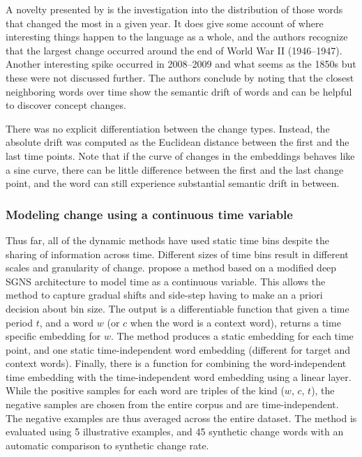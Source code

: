 \documentclass[output=paper]{langsci/langscibook}
\begin{document}
A novelty presented by \citet{rudolphb18-dynamicembforlangevo} is the investigation into the distribution of those words that changed the most in a given year. It does give some account of where interesting things happen to the language as a whole, and the authors recognize that the largest change occurred around the end of World War II (1946--1947). 
Another interesting spike occurred in 2008--2009 and what seems as the 1850s but these were not discussed further. 
The authors conclude by noting that the closest neighboring words over time show the semantic drift of words and can be helpful to discover concept changes. 

 There was no explicit differentiation between the change types. Instead, 
the absolute drift was computed as the Euclidean distance between the first and the last time points. Note that if the curve of changes in the embeddings behaves like a sine curve, there can be little difference between the first and the last change point, and the word can still experience substantial semantic drift in between.


\subsubsection{Modeling change using a continuous time variable}
Thus far, all of the dynamic methods have used static time bins despite the sharing of information across time. Different sizes of time bins result in different scales and granularity of change.  \citet{rosenfeld-erk-2018-deep} propose a method based on a modified deep SGNS architecture to model time as a continuous variable. This allows the method to capture gradual shifts and side-step having to make an a priori decision about bin size. The output is a differentiable function that given a time period $t$, and a word $w$ (or $c$ when the word is a context word), returns a time specific embedding for $w$. The method produces a static embedding for each time point, and one static time-independent word embedding (different for target and context words). Finally, there is a function for combining the word-independent time embedding with the time-independent word embedding using a linear layer.
While the positive samples for each word are triples of the kind ($w$, $c$, $t$), the negative samples are chosen from the entire corpus and are time-independent. The negative examples are thus averaged across the entire dataset. The method is evaluated using 5 illustrative examples, and 45 synthetic change words with an automatic comparison to synthetic change rate.
\end{document}
